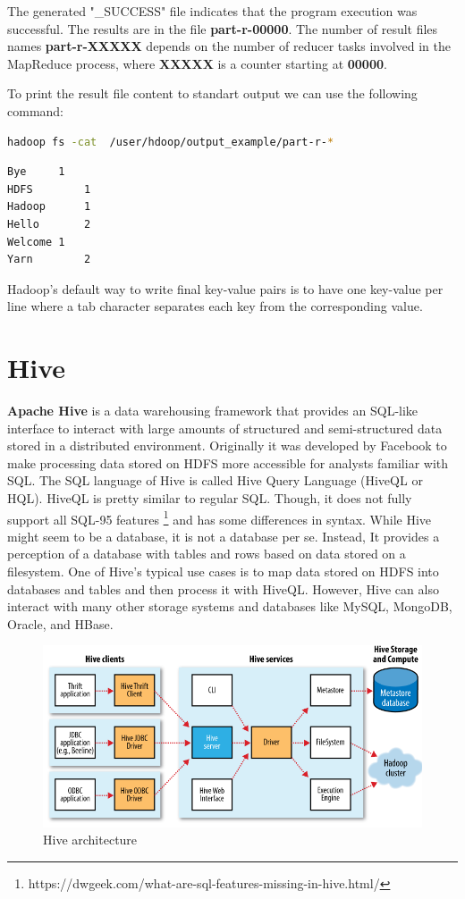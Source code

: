 \documentclass[12pt,english]{book}
\begin{document}
The generated "\_SUCCESS" file indicates that the program execution was successful.
The results are in the file \textbf{part-r-00000}. 
The number of result files names \textbf{part-r-XXXXX} depends on the number of reducer tasks involved in the MapReduce process, where \textbf{XXXXX} is a counter starting at \textbf{00000}.

To print the result file content to standart output we can use the following command:

\begin{lstlisting}[language=bash, frame=single]
hadoop fs -cat  /user/hdoop/output_example/part-r-*
\end{lstlisting}
 
\begin{lstlisting}[language=bash, frame=single]
Bye		1
HDFS		1
Hadoop		1
Hello		2
Welcome	1
Yarn		2 
\end{lstlisting}

Hadoop's default way to write final key-value pairs is to have one key-value per line where a tab character separates each key from the corresponding value.

\section{Hive}

\textbf{Apache Hive} is a data warehousing framework that provides an SQL-like interface to interact with large amounts of structured and semi-structured data stored in a distributed environment.
Originally it was developed by Facebook to make processing data stored on HDFS more accessible for analysts familiar with SQL.
The SQL language of Hive is called Hive Query Language (HiveQL or HQL).
HiveQL is pretty similar to regular SQL.
Though, it does not fully support all SQL-95 features \footnote{https://dwgeek.com/what-are-sql-features-missing-in-hive.html/} and has some differences in syntax.
While Hive might seem to be a database, it is not a database per se. 
Instead, It provides a perception of a database with tables and rows based on data stored on a filesystem.
One of Hive's typical use cases is to map data stored on HDFS into databases and tables and then process it with HiveQL.
However, Hive can also interact with many other storage systems and databases like MySQL, MongoDB, Oracle, and HBase.

\begin{figure}[ht]
	\centering
	\includegraphics[width=\linewidth]{hiveSchema}
	\caption[Hive architecture]{Hive architecture \footnotemark}
\end{figure}
\end{document}
